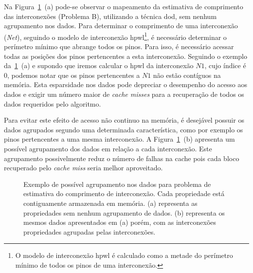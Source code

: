 Na Figura~\ref{fig:sorting_data_example}~(a) pode-se observar o mapeamento da estimativa de comprimento das interconexões (Problema B), utilizando a técnica \ac{dod}, sem nenhum agrupamento nos dados.
Para determinar o comprimento de uma interconexão (\textit{Net}), seguindo o modelo de interconexão \ac{hpwl}\footnote{O modelo de interconexão \ac{hpwl} é calculado como a metade do perímetro mínimo de todos os pinos de uma interconexão.}, é necessário determinar o perímetro mínimo que abrange todos os pinos.
Para isso, é necessário acessar todas as posições dos pinos pertencentes a esta interconexão.
Seguindo o exemplo da~\ref{fig:sorting_data_example}~(a) e supondo que iremos calcular o \ac{hpwl} da interconexão $N1$, cujo índice é $0$, podemos notar que os pinos pertencentes a $N1$ não estão contíguos na memória.
Esta esparsidade nos dados pode depreciar o desempenho do acesso aos dados e exigir um número maior de \textit{cache misses} para a recuperação de todos os dados requeridos pelo algoritmo.

Para evitar este efeito de acesso não continuo na memória, é desejável possuir os dados agrupados segundo uma determinada característica, como por exemplo os pinos pertencentes a uma mesma interconexão. A Figura~\ref{fig:sorting_data_example}~(b) apresenta um possível agrupamento dos dados em relação a cada interconexão.
Este agrupamento possivelmente reduz o número de falhas na cache pois cada bloco recuperado pelo \textit{cache miss} seria melhor aproveitado.


\begin{figure}[t]
    \centering

    \caption[Exemplo de agrupamento dos dados]{Exemplo de possível agrupamento nos dados para problema de estimativa do comprimento de interconexão. Cada propriedade está contiguamente armazenada em memória. (a) representa as propriedades sem nenhum agrupamento de dados. (b) representa os mesmos dados apresentados em (a) porém, com as interconexões propriedades agrupadas pelas interconexões.}
    \label{fig:sorting_data_example}
\end{figure}
